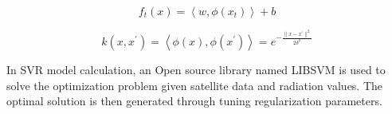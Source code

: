 \documentclass[conference]{IEEEtran}
\begin{document}
\begin{equation}
f_{t}(x)=\left \langle w,\phi(x_{t}) \right \rangle + b 
\label{eq:RBFfx}
\end{equation}


\begin{equation}
\label{rbfkernel}
k(x,x^{\prime})=\left \langle \phi(x),\phi(x^{\prime}) \right \rangle
=e^{-\frac{\parallel x-x^{\prime} \parallel^2}{2\delta^2}}
\end{equation}

In SVR model calculation, an Open source library named LIBSVM\cite{CC01a} is
used to solve the optimization problem given satellite data and radiation
values. The optimal solution is then generated through tuning regularization
parameters.



% 

\end{document}

